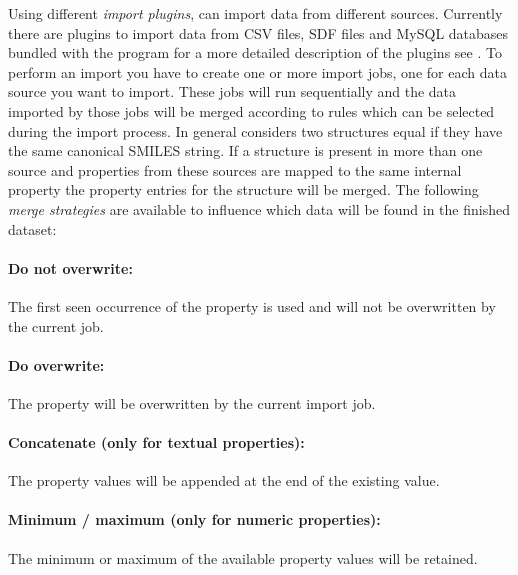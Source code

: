Using different \emph{import plugins}, \sh can import data from different
sources. Currently there are plugins to import data from CSV files, SDF files
and MySQL databases bundled with the program for a more detailed description of
the plugins see . To perform an import you
have to  create one or more import jobs, one for each data source you want to
import. These jobs will run sequentially and the data imported by those jobs
will be merged according to rules which can be selected during the import
process. In general \sh considers two structures equal if they have the same
canonical SMILES string. If a structure is present in more than one source and properties
from these sources are mapped to the same internal property the property entries
for the structure will be merged. The following \emph{merge strategies} are
available to influence which data will be found in the finished dataset:
\label{par:importing_data_merge_strategies}
\paragraph{Do not overwrite:} The first seen occurrence of the property is used and will not be overwritten by the current job.
\paragraph{Do overwrite:} The property will be overwritten by the current import job.
\paragraph{Concatenate (only for textual properties):} The property values will
be appended at the end of the existing value.
\paragraph{Minimum / maximum (only for numeric properties):} The minimum or
maximum of the available property values will be retained.


